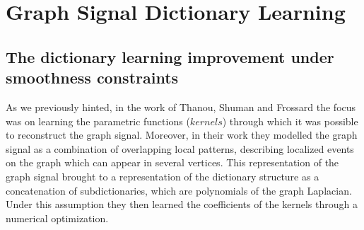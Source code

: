 \chapter{Graph Signal Dictionary Learning}
\section{The dictionary learning improvement under smoothness constraints}
\label{sec:DL}
As we previously hinted, in the work of Thanou, Shuman and Frossard the focus was on learning the parametric functions ($kernels$) through which it was possible to reconstruct the graph signal. Moreover, in their work they modelled the graph signal as a combination of overlapping local patterns, describing localized events on the graph which can appear in several vertices. This representation of the graph signal brought to a representation of the dictionary structure as a concatenation of subdictionaries, which are polynomials of the graph Laplacian. Under this assumption they then learned the coefficients of the kernels through a numerical optimization.

